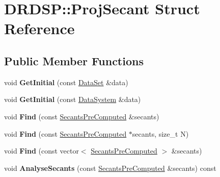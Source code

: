 \hypertarget{struct_d_r_d_s_p_1_1_proj_secant}{\section{D\-R\-D\-S\-P\-:\-:Proj\-Secant Struct Reference}
\label{struct_d_r_d_s_p_1_1_proj_secant}
}
\subsection*{Public Member Functions}
\begin{DoxyCompactItemize}
\item 
\hypertarget{struct_d_r_d_s_p_1_1_proj_secant_aaefd4fae1d6f593b4f3699f866421b2c}{void {\bfseries Get\-Initial} (const \hyperlink{struct_d_r_d_s_p_1_1_data_set}{Data\-Set} \&data)}\label{struct_d_r_d_s_p_1_1_proj_secant_aaefd4fae1d6f593b4f3699f866421b2c}

\item 
\hypertarget{struct_d_r_d_s_p_1_1_proj_secant_a9c9ff355f1c573933201b714f73063a5}{void {\bfseries Get\-Initial} (const \hyperlink{struct_d_r_d_s_p_1_1_data_system}{Data\-System} \&data)}\label{struct_d_r_d_s_p_1_1_proj_secant_a9c9ff355f1c573933201b714f73063a5}

\item 
\hypertarget{struct_d_r_d_s_p_1_1_proj_secant_a6a8623152ec81a33eba68b44b4c79690}{void {\bfseries Find} (const \hyperlink{struct_d_r_d_s_p_1_1_secants_pre_computed}{Secants\-Pre\-Computed} \&secants)}\label{struct_d_r_d_s_p_1_1_proj_secant_a6a8623152ec81a33eba68b44b4c79690}

\item 
\hypertarget{struct_d_r_d_s_p_1_1_proj_secant_add0fcf2bf615c58b2b1f1de17431b9aa}{void {\bfseries Find} (const \hyperlink{struct_d_r_d_s_p_1_1_secants_pre_computed}{Secants\-Pre\-Computed} $\ast$secants, size\-\_\-t N)}\label{struct_d_r_d_s_p_1_1_proj_secant_add0fcf2bf615c58b2b1f1de17431b9aa}

\item 
\hypertarget{struct_d_r_d_s_p_1_1_proj_secant_a86e5d2697efbde14d9bc25936dca7395}{void {\bfseries Find} (const vector$<$ \hyperlink{struct_d_r_d_s_p_1_1_secants_pre_computed}{Secants\-Pre\-Computed} $>$ \&secants)}\label{struct_d_r_d_s_p_1_1_proj_secant_a86e5d2697efbde14d9bc25936dca7395}

\item 
\hypertarget{struct_d_r_d_s_p_1_1_proj_secant_a5cd887b8b69d245d986dd6715937bf18}{void {\bfseries Analyse\-Secants} (const \hyperlink{struct_d_r_d_s_p_1_1_secants_pre_computed}{Secants\-Pre\-Computed} \&secants) const }\label{struct_d_r_d_s_p_1_1_proj_secant_a5cd887b8b69d245d986dd6715937bf18}


\end{DoxyCompactItemize}
